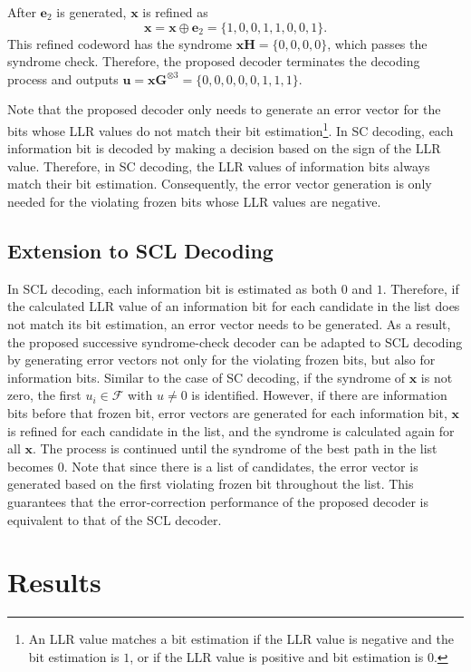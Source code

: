 \documentclass[conference]{IEEEtran}
\begin{document}
After $\bm{e}_2$ is generated, $\bm{x}$ is refined as
\begin{equation}
    \bm{x} = \bm{x} \oplus \bm{e}_2 = \{1,0,0,1,1,0,0,1\} \text{.}
\end{equation}
This refined codeword has the syndrome $\bm{x}\bm{H} = \{0,0,0,0\}$, which passes the syndrome check. Therefore, the proposed decoder terminates the decoding process and outputs $\bm{u} = \bm{x}\bm{G}^{\otimes 3} = \{0,0,0,0,0,1,1,1\}$.

Note that the proposed decoder only needs to generate an error vector for the bits whose LLR values do not match their bit estimation\footnote{An LLR value matches a bit estimation if the LLR value is negative and the bit estimation is $1$, or if the LLR value is positive and bit estimation is $0$.}. In SC decoding, each information bit is decoded by making a decision based on the sign of the LLR value. Therefore, in SC decoding, the LLR values of information bits always match their bit estimation. Consequently, the error vector generation is only needed for the violating frozen bits whose LLR values are negative.

\subsection{Extension to SCL Decoding}

In SCL decoding, each information bit is estimated as both $0$ and $1$. Therefore, if the calculated LLR value of an information bit for each candidate in the list does not match its bit estimation, an error vector needs to be generated. As a result, the proposed successive syndrome-check decoder can be adapted to SCL decoding by generating error vectors not only for the violating frozen bits, but also for information bits. Similar to the case of SC decoding, if the syndrome of $\bm{x}$ is not zero, the first $u_i\in\mathcal{F}$ with $u \neq 0$ is identified. However, if there are information bits before that frozen bit, error vectors are generated for each information bit, $\bm{x}$ is refined for each candidate in the list, and the syndrome is calculated again for all $\bm{x}$. The process is continued until the syndrome of the best path in the list becomes $0$. Note that since there is a list of candidates, the error vector is generated based on the first violating frozen bit throughout the list. This guarantees that the error-correction performance of the proposed decoder is equivalent to that of the SCL decoder.

\section{Results}
\end{document}
